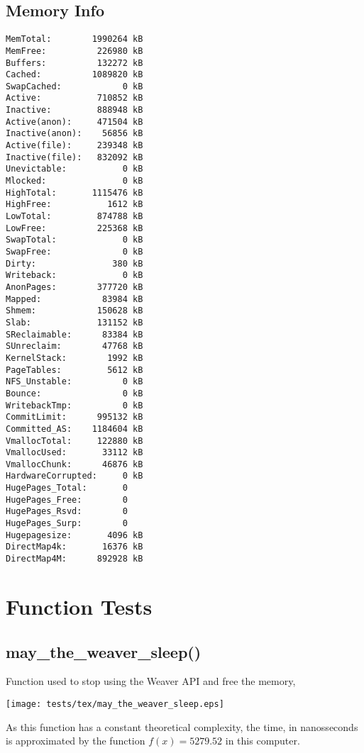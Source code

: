 \documentclass{article}
\begin{document}
\subsection{Memory Info}
\begin{verbatim}
MemTotal:        1990264 kB
MemFree:          226980 kB
Buffers:          132272 kB
Cached:          1089820 kB
SwapCached:            0 kB
Active:           710852 kB
Inactive:         888948 kB
Active(anon):     471504 kB
Inactive(anon):    56856 kB
Active(file):     239348 kB
Inactive(file):   832092 kB
Unevictable:           0 kB
Mlocked:               0 kB
HighTotal:       1115476 kB
HighFree:           1612 kB
LowTotal:         874788 kB
LowFree:          225368 kB
SwapTotal:             0 kB
SwapFree:              0 kB
Dirty:               380 kB
Writeback:             0 kB
AnonPages:        377720 kB
Mapped:            83984 kB
Shmem:            150628 kB
Slab:             131152 kB
SReclaimable:      83384 kB
SUnreclaim:        47768 kB
KernelStack:        1992 kB
PageTables:         5612 kB
NFS_Unstable:          0 kB
Bounce:                0 kB
WritebackTmp:          0 kB
CommitLimit:      995132 kB
Committed_AS:    1184604 kB
VmallocTotal:     122880 kB
VmallocUsed:       33112 kB
VmallocChunk:      46876 kB
HardwareCorrupted:     0 kB
HugePages_Total:       0
HugePages_Free:        0
HugePages_Rsvd:        0
HugePages_Surp:        0
Hugepagesize:       4096 kB
DirectMap4k:       16376 kB
DirectMap4M:      892928 kB
\end{verbatim}
\section{Function Tests}
\subsection{may\_the\_weaver\_sleep()}
Function used to stop using  the Weaver API and
free the memory,

\texttt{[image: tests/tex/may\_the\_weaver\_sleep.eps]}

As this function has a constant theoretical
complexity, the time, in nanosseconds is 
approximated by the function $f(x)=5279.52$
in this computer.
\end{document}
